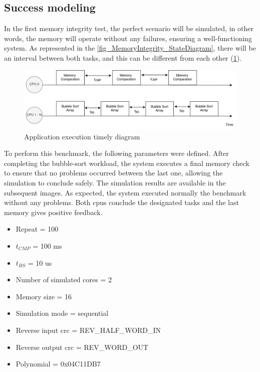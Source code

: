 \subsection{Success modeling}

In the first memory integrity test, the perfect scenario will be simulated, in other words, the memory will operate without any failures, 
ensuring a well-functioning system. As represented in the \autoref{fig_MemoryIntegrity_StateDiagram}, there will be an interval between both 
tasks, and this can be different from each other (\ref{fig_AppTimeDiagram}). 

\begin{figure}[H]
	\centering
 	\includegraphics[width=0.8\linewidth]{Images/AppTimeDiagram.png}
 	\caption{Application execution timely diagram}
	 \label{fig_AppTimeDiagram}
\end{figure}


To perform this benchmark, the following parameters were defined. After completing the bubble-sort workload, the system executes a final 
memory check to ensure that no problems occurred between the last one, allowing the simulation to conclude safely. The simulation results are 
available in the subsequent images. As expected, the system executed normally the benchmark without any problems. Both \glspl{cpu} conclude the 
designated tasks and the last memory gives positive feedback. 

\hspace{1.5cm}

\begin{multicols}{2}
	
	\begin{itemize}
		\item Repeat = 100
		\item $t_{CMP}$ = 100 ms
		\item $t_{BS}$ = 10 us
		\item Number of simulated cores = 2
		\item Memory size = 16
	\end{itemize}

	\columnbreak

	\begin{itemize}
		\item Simulation mode = sequential
		\item Reverse input \gls*{crc} = REV\_HALF\_WORD\_IN
		\item Reverse output \gls*{crc} = REV\_WORD\_OUT
		\item Polynomial = 0x04C11DB7
	\end{itemize}

\end{multicols}


